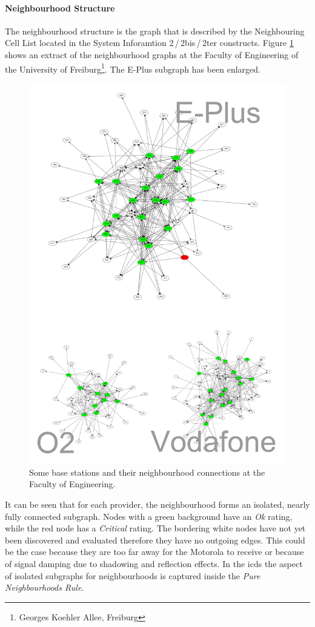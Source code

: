 \paragraph{Neighbourhood Structure}
The neighbourhood structure is the graph that is described by the Neighbouring Cell List located in the System Inforamtion 2\,/\,2bis\,/\,2ter constructs.
Figure \ref{fig:neighbourhood_example} shows an extract of the neighbourhood graphs at the Faculty of Engineering of the University of Freiburg\footnote{Georges Koehler Allee, Freiburg}.
The E-Plus subgraph has been enlarged.
\begin{figure}
\centering
\includegraphics[width=.9\textwidth]{../Images/neighbourhoods_fak}
\caption{Some base stations and their neighbourhood connections at the Faculty of Engineering.}
\label{fig:neighbourhood_example}
\end{figure}
It can be seen that for each provider, the neighbourhood forms an isolated, nearly fully connected subgraph.
Nodes with a green background have an \emph{Ok} rating, while the red node has a \emph{Critical} rating.
The bordering white nodes have not yet been discovered and evaluated therefore they have no outgoing edges.
This could be the case because they are too far away for the Motorola to receive or because of signal damping due to shadowing and reflection effects.
In the \gls{icds} the aspect of isolated subgraphs for neighbourhoods is captured inside the \emph{Pure Neighbourhoods Rule}.

